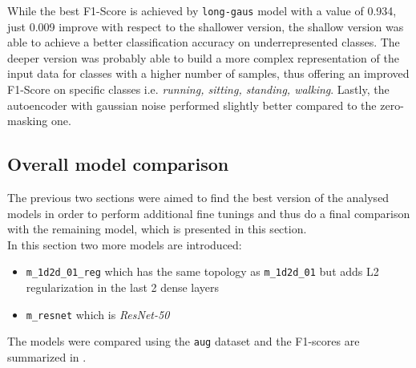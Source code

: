While the best \mbox{F1-Score} is achieved by \texttt{long-gaus} model with a value of 0.934, just 0.009 improve with respect to the shallower version, the shallow version was able to achieve a better classification accuracy on underrepresented classes. The deeper version was probably able to build a more complex representation of the input data for classes with a higher number of samples, thus offering an improved \mbox{F1-Score} on specific classes i.e. {\it running, sitting, standing, walking}. Lastly, the autoencoder with gaussian noise performed slightly better compared to the zero-masking one.

\subsection{Overall model comparison}
\label{sec:final_results}
The previous two sections were aimed to find the best version of the analysed models in order to perform additional fine tunings and thus do a final comparison with the remaining model, which is presented in this section.\\
In this section two more models are introduced:
\begin{itemize}
\item \texttt{m_1d2d_01_reg} which has the same topology as \texttt{m_1d2d_01} but adds L2 regularization in the last 2 dense layers
\item \texttt{m_resnet} which is {\it ResNet-50}
\end{itemize}

The models were compared using the \texttt{aug} dataset and the \mbox{F1-scores} are summarized in .


